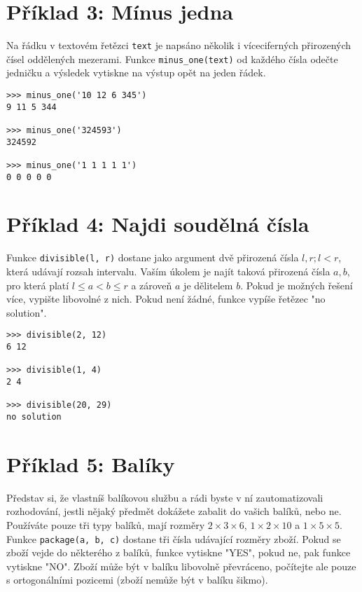 \documentclass{paper}
\begin{document}
\section*{Příklad 3: Mínus jedna}
\noindent
Na řádku v textovém řetězci \verb!text! je napsáno několik i víceciferných přirozených čísel oddělených mezerami. Funkce \verb!minus_one(text)! od každého čísla odečte jedničku a výsledek vytiskne na výstup opět na jeden řádek.


\begin{lstlisting}
>>> minus_one('10 12 6 345')
9 11 5 344

>>> minus_one('324593')
324592

>>> minus_one('1 1 1 1 1')
0 0 0 0 0

\end{lstlisting}

\section*{Příklad 4: Najdi soudělná čísla}
\noindent
Funkce \verb!divisible(l, r)! dostane jako argument dvě přirozená čísla $l, r; l < r$, která udávají rozsah intervalu. Vaším úkolem je najít taková přirozená čísla $a, b$, pro která platí $l \leq a < b \leq r$ a zároveň $a$ je dělitelem $b$. Pokud je možných řešení více, vypište libovolné z nich. Pokud není žádné, funkce vypíše řetězec "no solution".


\begin{lstlisting}
>>> divisible(2, 12)
6 12

>>> divisible(1, 4)
2 4

>>> divisible(20, 29)
no solution

\end{lstlisting}


\section*{Příklad 5: Balíky}
\noindent
Představ si, že vlastníš balíkovou službu a rádi byste v ní zautomatizovali rozhodování, jestli nějaký předmět dokážete zabalit do vašich balíků, nebo ne. Používáte pouze tři typy balíků, mají rozměry $2 \times 3 \times 6$, $1 \times 2 \times 10$ a $1 \times 5 \times 5$. Funkce \verb!package(a, b, c)! dostane tři čísla udávající rozměry zboží. Pokud se zboží vejde do některého z balíků, funkce vytiskne "YES", pokud ne, pak funkce vytiskne "NO". Zboží může být v balíku libovolně převráceno, počítejte ale pouze s ortogonálními pozicemi (zboží nemůže být v balíku šikmo).
\end{document}
